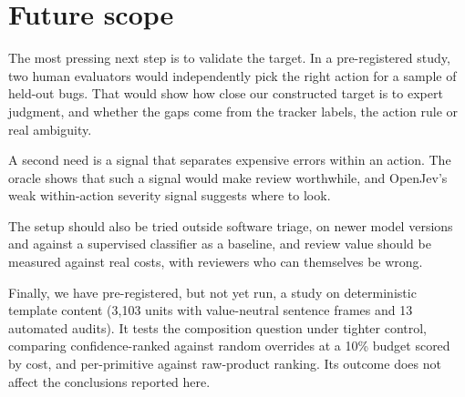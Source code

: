 \section{Future scope}
\label{sec:future}

The most pressing next step is to validate the target. In a
pre-registered study, two human evaluators would independently pick the
right action for a sample of held-out bugs. That would show how close our
constructed target is to expert judgment, and whether the gaps come from
the tracker labels, the action rule or real ambiguity.

A second need is a signal that separates expensive errors within an
action. The oracle shows that such a signal would make review worthwhile,
and OpenJev's weak within-action severity signal suggests where to look.

The setup should also be tried outside software triage, on newer model
versions and against a supervised classifier as a baseline, and review
value should be measured against real costs, with reviewers who can
themselves be wrong.

Finally, we have pre-registered, but not yet run, a study on
deterministic template content (3{,}103 units with value-neutral sentence
frames and 13 automated audits). It tests the composition question under
tighter control, comparing confidence-ranked against random overrides at
a 10\% budget scored by cost, and per-primitive against raw-product
ranking. Its outcome does not affect the conclusions reported here.
